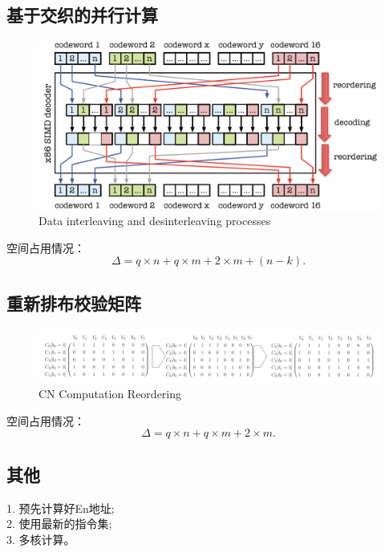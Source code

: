 \documentclass{article}
\begin{document}
\subsection{基于交织的并行计算}
\begin{figure}[H]
	\centering
	\includegraphics[width = .8\textwidth]{inter.png}
	\caption{Data interleaving and desinterleaving processes}
\end{figure}
空间占用情况：
\begin{equation}
	\Delta = q \times n + q \times m + 2 \times m + (n-k).
\end{equation}
\subsection{重新排布校验矩阵}
\begin{figure}[H]
	\centering
	\includegraphics[width = \textwidth]{matrix.pdf}
	\caption{CN Computation Reordering}
\end{figure}
空间占用情况：
\begin{equation}
	\Delta = q \times n + q \times m + 2 \times m.
\end{equation}
\subsection{其他}
1. 预先计算好En地址;\\
2. 使用最新的指令集;\\
3. 多核计算。

\end{document}
